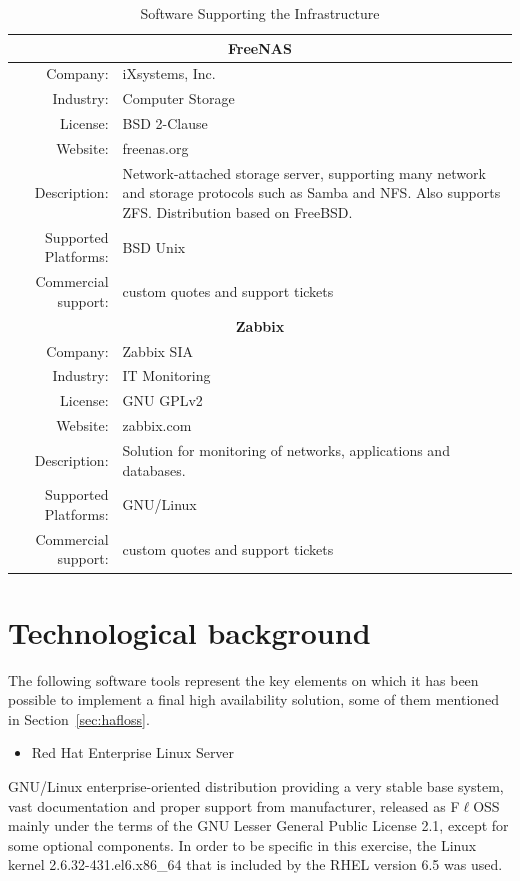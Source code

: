 \documentclass[a4paper, 12pt]{book}
\begin{document}
\begin{table}
\begin{tabular}{ | r m{10cm} | }
    \hline    
    \multicolumn{2}{|c|}{\textbf{FreeNAS}}\\
    \hline
    Company: & iXsystems, Inc. \\
    Industry: & Computer Storage \\
    License: & BSD 2-Clause \\
    Website: & freenas.org \\
    Description: & Network-attached storage server, supporting many network and storage protocols such as Samba and NFS. Also supports ZFS. Distribution based on FreeBSD. \\
    Supported Platforms: & BSD Unix \\
    Commercial support: & custom quotes and support tickets \\
    \hline
    \multicolumn{2}{|c|}{\textbf{Zabbix}}\\
    \hline
    Company: & Zabbix SIA \\
    Industry: & IT Monitoring \\
    License: & GNU GPLv2 \\
    Website: & zabbix.com \\
    Description: & Solution for monitoring of networks, applications and databases. \\
    Supported Platforms: & GNU/Linux \\
    Commercial support: & custom quotes and support tickets \\
    \hline
  \end{tabular}
\caption{Software Supporting the Infrastructure}
\label{table:technologies}
\end{table}


%
\chapter{Technological background}
\label{chap:implemented}

The following software tools represent the key elements on which it has been possible to implement a final high availability solution, some of them mentioned in Section~\ref{sec:hafloss}.

\begin{itemize}[leftmargin=*]
	\item Red Hat Enterprise Linux Server
\end{itemize}

\noindent GNU/Linux enterprise-oriented distribution providing a very stable base system, vast documentation and proper support from manufacturer, released as F$\ell$OSS mainly under the terms of the GNU Lesser General Public License 2.1, except for some optional components. In order to be specific in this exercise, the Linux kernel 2.6.32-431.el6.x86\_64 that is included by the RHEL version 6.5 was used.
\end{document}
